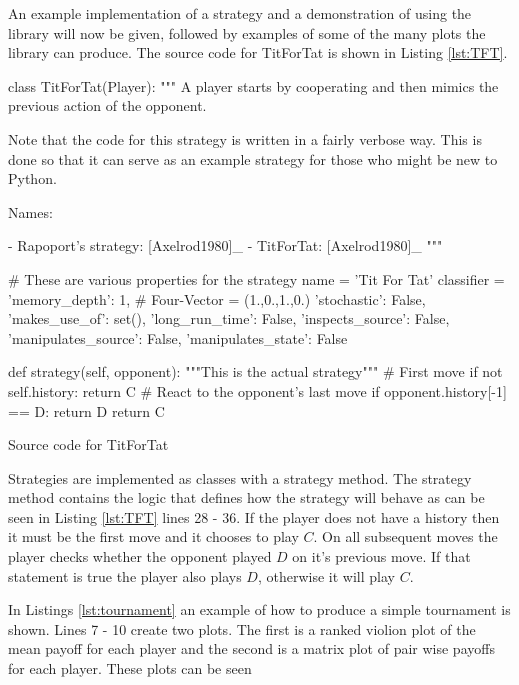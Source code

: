 An example implementation of a strategy and a demonstration of using the library will now be given, followed by examples of some of the many plots the library can produce.
The source code for TitForTat is shown in Listing \ref{lst:TFT}.

\begin{listing}[htbp!]
\begin{SourceCode}
class TitForTat(Player):
    """
    A player starts by cooperating and then mimics the previous action of the
    opponent.

    Note that the code for this strategy is written in a fairly verbose
    way. This is done so that it can serve as an example strategy for
    those who might be new to Python.

    Names:

    - Rapoport's strategy: [Axelrod1980]_
    - TitForTat: [Axelrod1980]_
    """

    # These are various properties for the strategy
    name = 'Tit For Tat'
    classifier = {
        'memory_depth': 1,  # Four-Vector = (1.,0.,1.,0.)
        'stochastic': False,
        'makes_use_of': set(),
        'long_run_time': False,
        'inspects_source': False,
        'manipulates_source': False,
        'manipulates_state': False
    }

    def strategy(self, opponent):
        """This is the actual strategy"""
        # First move
        if not self.history:
            return C
        # React to the opponent's last move
        if opponent.history[-1] == D:
            return D
        return C
\end{SourceCode}
\caption{Source code for TitForTat}
\label{lst:TFT}
\end{listing}

Strategies are implemented as classes with a strategy method.
The strategy method contains the logic that defines how the strategy will behave as can be seen in Listing \ref{lst:TFT} lines 28 - 36.
If the player does not have a history then it must be the first move and it chooses to play $C$.
On all subsequent moves the player checks whether the opponent played $D$ on it's previous move.
If that statement is true the player also plays $D$, otherwise it will play $C$.

In Listings \ref{lst:tournament} an example of how to produce a simple tournament is shown.
Lines 7 - 10 create two plots.
The first is a ranked violion plot of the mean payoff for each player and the second is a matrix plot of pair wise payoffs for each player.
These plots can be seen

